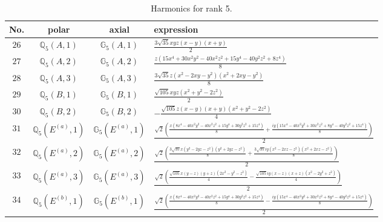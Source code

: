 \documentclass[fleqn,8pt,landscape]{jsarticle}
\begin{document}
\begin{table}[ht!]
\begin{center}
\caption{Harmonics for rank 5.}
\renewcommand{\arraystretch}{1.3}
\begin{tabular}{cccl} \hline \hline
No. & polar & axial & expression \\ \hline
$ 26 $ & $ \mathbb{Q}_{5}(A,1) $ & $ \mathbb{G}_{5}(A,1) $ & $ \frac{3 \sqrt{35} x y z \left(x - y\right) \left(x + y\right)}{2} $ \\
$ 27 $ & $ \mathbb{Q}_{5}(A,2) $ & $ \mathbb{G}_{5}(A,2) $ & $ \frac{z \left(15 x^{4} + 30 x^{2} y^{2} - 40 x^{2} z^{2} + 15 y^{4} - 40 y^{2} z^{2} + 8 z^{4}\right)}{8} $ \\
$ 28 $ & $ \mathbb{Q}_{5}(A,3) $ & $ \mathbb{G}_{5}(A,3) $ & $ \frac{3 \sqrt{35} z \left(x^{2} - 2 x y - y^{2}\right) \left(x^{2} + 2 x y - y^{2}\right)}{8} $ \\
$ 29 $ & $ \mathbb{Q}_{5}(B,1) $ & $ \mathbb{G}_{5}(B,1) $ & $ \frac{\sqrt{105} x y z \left(x^{2} + y^{2} - 2 z^{2}\right)}{2} $ \\
$ 30 $ & $ \mathbb{Q}_{5}(B,2) $ & $ \mathbb{G}_{5}(B,2) $ & $ - \frac{\sqrt{105} z \left(x - y\right) \left(x + y\right) \left(x^{2} + y^{2} - 2 z^{2}\right)}{4} $ \\
$ 31 $ & $ \mathbb{Q}_{5}(E^{(a)},1) $ & $ \mathbb{G}_{5}(E^{(a)},1) $ & $ \frac{\sqrt{2} \left(\frac{x \left(8 x^{4} - 40 x^{2} y^{2} - 40 x^{2} z^{2} + 15 y^{4} + 30 y^{2} z^{2} + 15 z^{4}\right)}{8} + \frac{i y \left(15 x^{4} - 40 x^{2} y^{2} + 30 x^{2} z^{2} + 8 y^{4} - 40 y^{2} z^{2} + 15 z^{4}\right)}{8}\right)}{2} $ \\
$ 32 $ & $ \mathbb{Q}_{5}(E^{(a)},2) $ & $ \mathbb{G}_{5}(E^{(a)},2) $ & $ \frac{\sqrt{2} \left(\frac{3 \sqrt{35} x \left(y^{2} - 2 y z - z^{2}\right) \left(y^{2} + 2 y z - z^{2}\right)}{8} + \frac{3 \sqrt{35} i y \left(x^{2} - 2 x z - z^{2}\right) \left(x^{2} + 2 x z - z^{2}\right)}{8}\right)}{2} $ \\
$ 33 $ & $ \mathbb{Q}_{5}(E^{(a)},3) $ & $ \mathbb{G}_{5}(E^{(a)},3) $ & $ \frac{\sqrt{2} \left(\frac{\sqrt{105} x \left(y - z\right) \left(y + z\right) \left(2 x^{2} - y^{2} - z^{2}\right)}{4} - \frac{\sqrt{105} i y \left(x - z\right) \left(x + z\right) \left(x^{2} - 2 y^{2} + z^{2}\right)}{4}\right)}{2} $ \\
$ 34 $ & $ \mathbb{Q}_{5}(E^{(b)},1) $ & $ \mathbb{G}_{5}(E^{(b)},1) $ & $ \frac{\sqrt{2} \left(\frac{x \left(8 x^{4} - 40 x^{2} y^{2} - 40 x^{2} z^{2} + 15 y^{4} + 30 y^{2} z^{2} + 15 z^{4}\right)}{8} - \frac{i y \left(15 x^{4} - 40 x^{2} y^{2} + 30 x^{2} z^{2} + 8 y^{4} - 40 y^{2} z^{2} + 15 z^{4}\right)}{8}\right)}{2} $ \\

\end{tabular}
\end{center}
\end{table}
\end{document}
